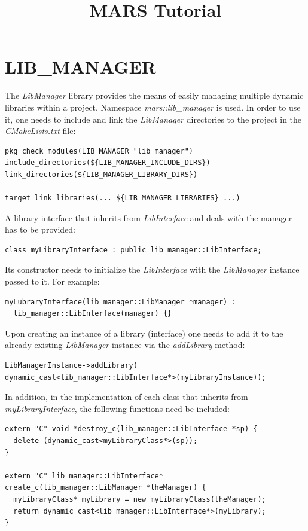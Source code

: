 \documentclass{article}
\title{MARS Tutorial}
\begin{document}
\maketitle

\section{LIB\_MANAGER}

The \emph{LibManager} library provides the means of easily managing multiple dynamic libraries within a project. Namespace \emph{mars::lib\_manager} is used.
In order to use it, one needs to include and link the \emph{LibManager} directories to the project in the \emph{CMakeLists.txt} file:

\begin{lstlisting}
pkg_check_modules(LIB_MANAGER "lib_manager")
include_directories(${LIB_MANAGER_INCLUDE_DIRS})
link_directories(${LIB_MANAGER_LIBRARY_DIRS})

target_link_libraries(... ${LIB_MANAGER_LIBRARIES} ...)
\end{lstlisting}

A library interface that inherits from \emph{LibInterface} and deals with the manager has to be provided:

\begin{lstlisting}
class myLibraryInterface : public lib_manager::LibInterface;
\end{lstlisting}

Its constructor needs to initialize the \emph{LibInterface} with the \emph{LibManager} instance passed to it. For example:

\begin{lstlisting}
myLubraryInterface(lib_manager::LibManager *manager) : 
  lib_manager::LibInterface(manager) {}
\end{lstlisting}

Upon creating an instance of a library (interface) one needs to add it to the already existing \emph{LibManager} instance
via the \emph{addLibrary} method:

\begin{lstlisting}
LibManagerInstance->addLibrary(
dynamic_cast<lib_manager::LibInterface*>(myLibraryInstance));
\end{lstlisting}

In addition, in the implementation of each class that inherits from \emph{myLibraryInterface}, the following functions need 
be included:

\begin{lstlisting}
extern "C" void *destroy_c(lib_manager::LibInterface *sp) {
  delete (dynamic_cast<myLibraryClass*>(sp));
}

extern "C" lib_manager::LibInterface* 
create_c(lib_manager::LibManager *theManager) {
  myLibraryClass* myLibrary = new myLibraryClass(theManager);
  return dynamic_cast<lib_manager::LibInterface*>(myLibrary);
}
\end{lstlisting}
\end{document}
